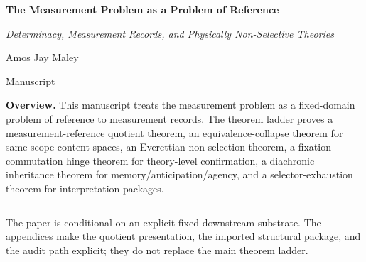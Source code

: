 \documentclass[11pt]{article}
\theoremstyle{definition}
\theoremstyle{plain}
\newcommand{\MainTitle}{The Measurement Problem as a Problem of Reference}
\newcommand{\SubTitle}{Determinacy, Measurement Records, and Physically Non-Selective Theories}
\begin{document}
\hypersetup{pageanchor=false}

\begin{titlepage}
\centering
\vspace*{1.25cm}

{\huge\bfseries \MainTitle\par}
\vspace{0.28cm}
{\Large\itshape \SubTitle\par}
\vspace{0.9cm}
{\large Amos Jay Maley\par}
\vspace{0.15cm}
{\normalsize Manuscript\par}
\vspace{0.7cm}

\begin{claimbox}[width=0.93\textwidth]
\textbf{Overview.} This manuscript treats the measurement problem as a fixed-domain problem of
reference to measurement records. The theorem ladder proves a measurement-reference quotient
theorem, an equivalence-collapse theorem for same-scope content spaces, an Everettian non-selection
theorem, a fixation-commutation hinge theorem for theory-level confirmation, a diachronic
inheritance theorem for memory/anticipation/agency, and a selector-exhaustion theorem for
interpretation packages.
\end{claimbox}

\vfill

\begin{tabular}{>{\raggedright\arraybackslash}p{}p{}}

\end{tabular}

\vfill

{\small\color{midgray}The paper is conditional on an explicit fixed downstream substrate. The
appendices make the quotient presentation, the imported structural package, and the audit path
explicit; they do not replace the main theorem ladder.}
\end{titlepage}

\hypersetup{pageanchor=true}
\end{document}
